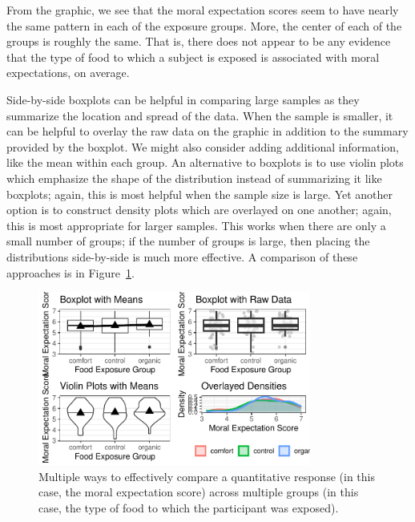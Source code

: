 \documentclass[
  letterpaper,
  DIV=11,
  numbers=noendperiod]{scrreprt}
\theoremstyle{plain}
\theoremstyle{definition}
\theoremstyle{definition}
\theoremstyle{remark}
\begin{document}
From the graphic, we see that the moral expectation scores seem to have
nearly the same pattern in each of the exposure groups. More, the center
of each of the groups is roughly the same. That is, there does not
appear to be any evidence that the type of food to which a subject is
exposed is associated with moral expectations, on average.

Side-by-side boxplots can be helpful in comparing large samples as they
summarize the location and spread of the data. When the sample is
smaller, it can be helpful to overlay the raw data on the graphic in
addition to the summary provided by the boxplot. We might also consider
adding additional information, like the mean within each group. An
alternative to boxplots is to use violin plots which emphasize the shape
of the distribution instead of summarizing it like boxplots; again, this
is most helpful when the sample size is large. Yet another option is to
construct density plots which are overlayed on one another; again, this
is most appropriate for larger samples. This works when there are only a
small number of groups; if the number of groups is large, then placing
the distributions side-by-side is much more effective. A comparison of
these approaches is in
Figure~\ref{fig-anovasummaries-organic-comparison}.

\begin{figure}

{\centering \includegraphics[width=0.8\textwidth,height=\textheight]{./images/fig-anovasummaries-organic-comparison-1.pdf}

}

\caption{\label{fig-anovasummaries-organic-comparison}Multiple ways to
effectively compare a quantitative response (in this case, the moral
expectation score) across multiple groups (in this case, the type of
food to which the participant was exposed).}

\end{figure}
\end{document}
